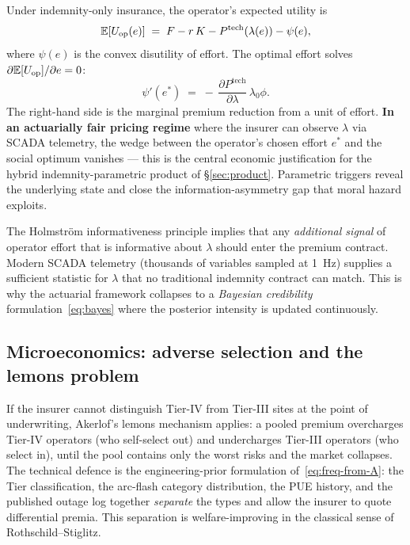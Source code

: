 Under indemnity-only insurance, the operator's expected utility is
\begin{equation}\label{eq:agent}
   \mathbb{E}[U_{\mathrm{op}}(e)] \;=\; F - r\,K - P^{\mathrm{tech}}(\lambda(e))
   - \psi(e),
\end{equation}
where $\psi(e)$ is the convex disutility of effort. The optimal effort
solves $\partial\mathbb{E}[U_{\mathrm{op}}]/\partial e=0$:
\begin{equation}\label{eq:efforth}
   \psi'(e^*) \;=\; -\,\frac{\partial P^{\mathrm{tech}}}{\partial\lambda}\,
                     \lambda_0 \phi.
\end{equation}
The right-hand side is the marginal premium reduction from a unit of
effort. \textbf{In an actuarially fair pricing regime} where the
insurer can observe $\lambda$ via SCADA telemetry, the wedge between
the operator's chosen effort $e^*$ and the social optimum vanishes ---
this is the central economic justification for the hybrid
indemnity-parametric product of \S\ref{sec:product}. Parametric
triggers reveal the underlying state and close the
information-asymmetry gap that moral hazard exploits.

\begin{rbox}
The Holmstr\"om informativeness principle implies that any
\emph{additional signal} of operator effort that is informative about
$\lambda$ should enter the premium contract. Modern SCADA telemetry
(thousands of variables sampled at \SI{1}{Hz}) supplies a sufficient
statistic for $\lambda$ that no traditional indemnity contract can
match. This is why the actuarial framework collapses to a
\emph{Bayesian credibility} formulation~\eqref{eq:bayes} where the
posterior intensity is updated continuously.
\end{rbox}

\subsection{Microeconomics: adverse selection and the lemons problem}\label{ss:lemons}

If the insurer cannot distinguish Tier-IV from Tier-III sites at the
point of underwriting, Akerlof's lemons mechanism applies: a pooled
premium overcharges Tier-IV operators (who self-select out) and
undercharges Tier-III operators (who select in), until the pool
contains only the worst risks and the market collapses. The technical
defence is the engineering-prior formulation
of~\eqref{eq:freq-from-A}: the Tier classification, the arc-flash
category distribution, the PUE history, and the published outage log
together \emph{separate} the types and allow the insurer to quote
differential premia. This separation is welfare-improving in the
classical sense of Rothschild--Stiglitz.

